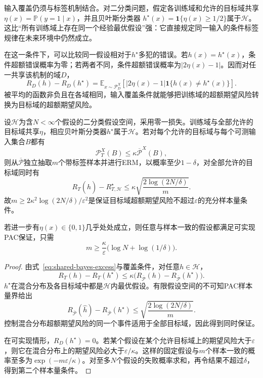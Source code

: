 输入覆盖仍须与标签机制结合。对二分类问题，假定各训练域和允许的目标域共享
$\eta(x)=\mathbb P(y=1\mid x)$，并且贝叶斯分类器
$h^\star(x)=\mathbf1\{\eta(x)\geq1/2\}$属于$\mathcal H$。这比“所有训练域上存在同一个经验最优假设”强：它直接规定同一输入的条件标签规律在未来环境中仍然成立。

在这一条件下，可以比较同一假设相对于$h^\star$多犯的错误。若$h(x)=h^\star(x)$，条件超额错误概率为零；若两者不同，条件超额错误概率为$|2\eta(x)-1|$。因而对任一共享该机制的域$D$，
\begin{equation}
 R_D(h)-R_D(h^\star)
 =\mathbb E_{x\sim\mathcal P_D^X}
   [|2\eta(x)-1|\mathbf1\{h(x)\neq h^\star(x)\}].
 \label{eq:shared-bayes-excess}
\end{equation}
被平均的函数非负且在各域相同，输入覆盖条件就能够把训练域的超额期望风险转换为目标域的超额期望风险。

\begin{theorem}[共享标签机制下的领域泛化]
\label{thm:dg-shared-pac}
设$\mathcal H$为含$N<\infty$个假设的二分类假设空间，采用零一损失。训练域与全部允许的目标域共享$\eta$，相应贝叶斯分类器$h^\star$属于$\mathcal H$。若对每个允许的目标域与每个可测输入集合$B$都有
\[
 \mathcal P_T^X(B)\leq\kappa\overline{\mathcal P}^{X}(B),
\]
则从$\overline{\mathcal P}$独立抽取$m$个带标签样本并进行ERM，以概率至少$1-\delta$，对全部允许的目标域同时有
\begin{equation}
 R_T(\widehat h)-R_{T,\mathcal H}^{\star}
 \leq\kappa\sqrt{\frac{2\log(2N/\delta)}{m}}.
 \label{eq:dg-shared-pac}
\end{equation}
故$m\geq2\kappa^2\log(2N/\delta)/\varepsilon^2$是保证目标域超额期望风险不超过$\varepsilon$的充分样本量条件。

若进一步有$\eta(x)\in\{0,1\}$几乎处处成立，则任意与样本一致的假设都满足可实现PAC保证，只需
\[
 m\geq\frac{\kappa}{\varepsilon}
       \bigl(\log N+\log(1/\delta)\bigr).
\]
\end{theorem}
\begin{proof}
由式~\eqref{eq:shared-bayes-excess}与覆盖条件，对任意$h\in\mathcal H$，
\[
 R_T(h)-R_T(h^\star)
 \leq\kappa\bigl(R_{\overline{\mathcal P}}(h)
                  -R_{\overline{\mathcal P}}(h^\star)\bigr).
\]
$h^\star$在混合分布及各目标域中都是$\mathcal H$内最优假设。有限假设空间的不可知PAC样本量界给出
\[
 R_{\overline{\mathcal P}}(\widehat h)
 -R_{\overline{\mathcal P}}(h^\star)
 \leq\sqrt{\frac{2\log(2N/\delta)}{m}}.
\]
控制混合分布超额期望风险的同一个事件适用于全部目标域，因此得到同时保证。

在可实现情形，$R_D(h^\star)=0$。若某个假设在某个允许目标域上的期望风险大于$\varepsilon$，则它在混合分布上的期望风险必大于$\varepsilon/\kappa$。这样的固定假设与$m$个样本一致的概率至多为$\exp(-m\varepsilon/\kappa)$。对至多$N$个假设的失败概率求和，再令结果不超过$\delta$，得到第二个样本量条件。
\end{proof}

